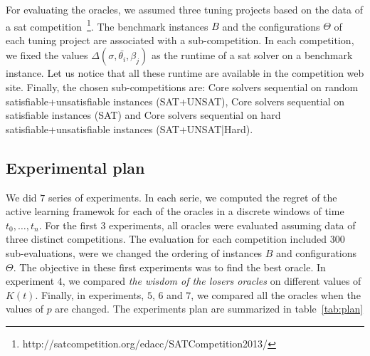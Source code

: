 \documentclass[10pt, conference, compsocconf]{IEEEtran}
\begin{document}
For evaluating the oracles, we assumed three tuning projects based on the data of a sat 
competition~\footnote{http://satcompetition.org/edacc/SATCompetition2013/}. The benchmark 
instances $B$ and the configurations $\Theta$ of each tuning project are associated 
with a sub-competition. In each competition, we fixed the values $\Delta(\sigma, \bar{\theta_i}, \beta_j)$ as the 
runtime of a sat solver on a benchmark instance. Let us notice that all these runtime are available 
in the competition web site. Finally, the chosen sub-competitions are: Core solvers sequential on random satisfiable+unsatisfiable instances (SAT+UNSAT), Core solvers sequential on satisfiable instances (SAT) and  Core solvers sequential on hard satisfiable+unsatisfiable instances (SAT+UNSAT|Hard). 

\subsection{Experimental plan}

We did $7$ series of experiments. In each serie, we computed the regret of the active learning framewok for each 
of the oracles in a discrete windows of time $t_0,\dots ,t_n$. 
For the first $3$ experiments, all oracles were evaluated assuming data of three distinct competitions. The 
evaluation for each competition included $300$ sub-evaluations, were we changed the ordering of instances $B$ and 
configurations $\Theta$.  The objective in these first experiments was to find the best oracle. In experiment $4$, we 
compared {\it the wisdom of the losers oracles} on different values of  $K(t)$. Finally, in experiments, 
$5$, $6$ and $7$, we compared all the oracles when the values of $p$ are changed. The experiments plan 
are summarized in table~\ref{tab:plan}
\end{document}
